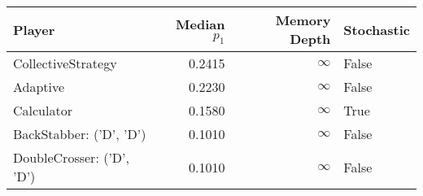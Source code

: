 \begin{tabular}{lrrl}
\toprule
                    Player &  Median $p_1$ &  Memory Depth & Stochastic \\
\midrule
        CollectiveStrategy &        0.2415 &            \(\infty\) &      False \\
                  Adaptive &        0.2230 &            \(\infty\) &      False \\
                Calculator &        0.1580 &            \(\infty\) &       True \\
   BackStabber: ('D', 'D') &        0.1010 &            \(\infty\) &      False \\
 DoubleCrosser: ('D', 'D') &        0.1010 &            \(\infty\) &      False \\
\bottomrule
\end{tabular}
